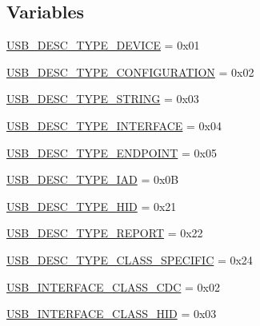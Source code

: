 \subsection*{\-Variables}
\begin{DoxyCompactItemize}
\item 
\hyperlink{group___p_i_o_s___u_s_b___d_e_f_s_ga5d5b7225b99998b8360b8767a2900e3f}{\-U\-S\-B\-\_\-\-D\-E\-S\-C\-\_\-\-T\-Y\-P\-E\-\_\-\-D\-E\-V\-I\-C\-E} = 0x01
\item 
\hyperlink{group___p_i_o_s___u_s_b___d_e_f_s_ga6eae039006b3ae9b8e3a01f07ab35514}{\-U\-S\-B\-\_\-\-D\-E\-S\-C\-\_\-\-T\-Y\-P\-E\-\_\-\-C\-O\-N\-F\-I\-G\-U\-R\-A\-T\-I\-O\-N} = 0x02
\item 
\hyperlink{group___p_i_o_s___u_s_b___d_e_f_s_gad0d513073ebd8880d40eb58bf2d8db8e}{\-U\-S\-B\-\_\-\-D\-E\-S\-C\-\_\-\-T\-Y\-P\-E\-\_\-\-S\-T\-R\-I\-N\-G} = 0x03
\item 
\hyperlink{group___p_i_o_s___u_s_b___d_e_f_s_ga264c8f6a9c7098cde24b8100333d5579}{\-U\-S\-B\-\_\-\-D\-E\-S\-C\-\_\-\-T\-Y\-P\-E\-\_\-\-I\-N\-T\-E\-R\-F\-A\-C\-E} = 0x04
\item 
\hyperlink{group___p_i_o_s___u_s_b___d_e_f_s_gabc893b3638b89aef5549274b6b5cdb43}{\-U\-S\-B\-\_\-\-D\-E\-S\-C\-\_\-\-T\-Y\-P\-E\-\_\-\-E\-N\-D\-P\-O\-I\-N\-T} = 0x05
\item 
\hyperlink{group___p_i_o_s___u_s_b___d_e_f_s_gafd77f72b6fc721482aa8b4da52d81966}{\-U\-S\-B\-\_\-\-D\-E\-S\-C\-\_\-\-T\-Y\-P\-E\-\_\-\-I\-A\-D} = 0x0\-B
\item 
\hyperlink{group___p_i_o_s___u_s_b___d_e_f_s_gac98c8cc86eb8aef9ea59ab530ae90778}{\-U\-S\-B\-\_\-\-D\-E\-S\-C\-\_\-\-T\-Y\-P\-E\-\_\-\-H\-I\-D} = 0x21
\item 
\hyperlink{group___p_i_o_s___u_s_b___d_e_f_s_gab9cf2626e6dc2b8126a7437ba89c2265}{\-U\-S\-B\-\_\-\-D\-E\-S\-C\-\_\-\-T\-Y\-P\-E\-\_\-\-R\-E\-P\-O\-R\-T} = 0x22
\item 
\hyperlink{group___p_i_o_s___u_s_b___d_e_f_s_ga8137d5b815f854936afe0560833d4c7b}{\-U\-S\-B\-\_\-\-D\-E\-S\-C\-\_\-\-T\-Y\-P\-E\-\_\-\-C\-L\-A\-S\-S\-\_\-\-S\-P\-E\-C\-I\-F\-I\-C} = 0x24
\item 
\hyperlink{group___p_i_o_s___u_s_b___d_e_f_s_ga58565a2d82321de264ab5857081bb7f3}{\-U\-S\-B\-\_\-\-I\-N\-T\-E\-R\-F\-A\-C\-E\-\_\-\-C\-L\-A\-S\-S\-\_\-\-C\-D\-C} = 0x02
\item 
\hyperlink{group___p_i_o_s___u_s_b___d_e_f_s_ga44130d45777cf4f11fd29079d56ef176}{\-U\-S\-B\-\_\-\-I\-N\-T\-E\-R\-F\-A\-C\-E\-\_\-\-C\-L\-A\-S\-S\-\_\-\-H\-I\-D} = 0x03
\item 

\end{DoxyCompactItemize}
